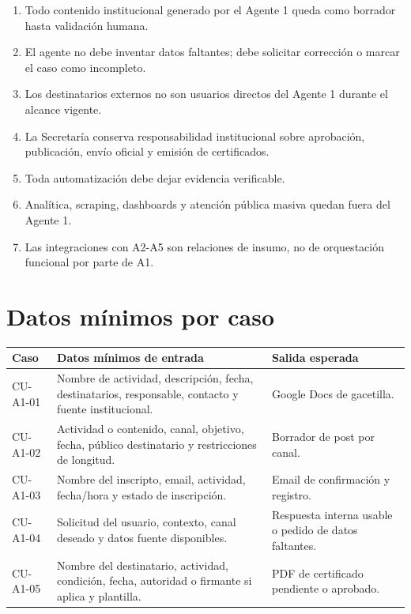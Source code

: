 \documentclass[11pt,a4paper]{article}
\begin{document}
\begin{enumerate}
  \item Todo contenido institucional generado por el Agente 1 queda como borrador hasta validación humana.
  \item El agente no debe inventar datos faltantes; debe solicitar corrección o marcar el caso como incompleto.
  \item Los destinatarios externos no son usuarios directos del Agente 1 durante el alcance vigente.
  \item La Secretaría conserva responsabilidad institucional sobre aprobación, publicación, envío oficial y emisión de certificados.
  \item Toda automatización debe dejar evidencia verificable.
  \item Analítica, scraping, dashboards y atención pública masiva quedan fuera del Agente 1.
  \item Las integraciones con A2-A5 son relaciones de insumo, no de orquestación funcional por parte de A1.
\end{enumerate}

\section{Datos mínimos por caso}

\begin{longtable}{p{}p{}p{}}
\toprule
\textbf{Caso} & \textbf{Datos mínimos de entrada} & \textbf{Salida esperada} \\
\midrule
\endhead
CU-A1-01 & Nombre de actividad, descripción, fecha, destinatarios, responsable, contacto y fuente institucional. & Google Docs de gacetilla. \\
CU-A1-02 & Actividad o contenido, canal, objetivo, fecha, público destinatario y restricciones de longitud. & Borrador de post por canal. \\
CU-A1-03 & Nombre del inscripto, email, actividad, fecha/hora y estado de inscripción. & Email de confirmación y registro. \\
CU-A1-04 & Solicitud del usuario, contexto, canal deseado y datos fuente disponibles. & Respuesta interna usable o pedido de datos faltantes. \\
CU-A1-05 & Nombre del destinatario, actividad, condición, fecha, autoridad o firmante si aplica y plantilla. & PDF de certificado pendiente o aprobado. \\
\bottomrule
\end{longtable}
\end{document}
